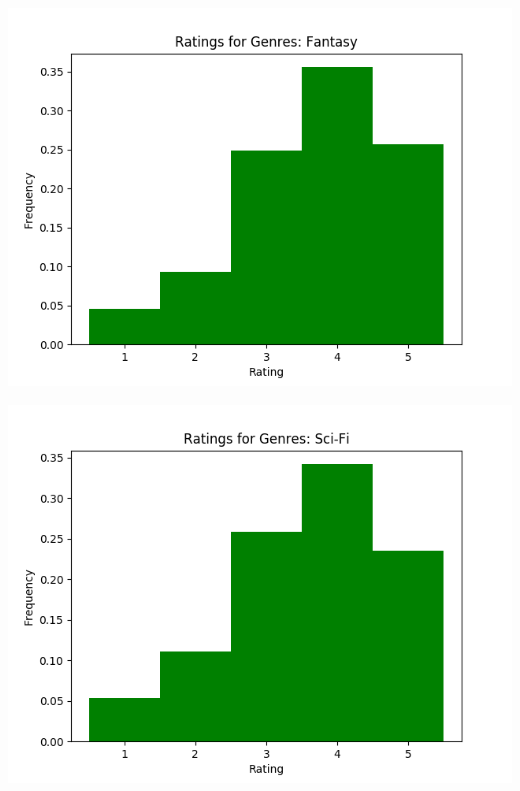 \begin{appendices}
\begin{center}
\begin{minipage}{0.49\linewidth}
  \end{minipage}
  \begin{minipage}{0.49\linewidth}
    \includegraphics[scale=0.5]{"Ratings for Genres: Fantasy"}
    \captionsetup{width=.75\linewidth}
  \end{minipage}
  \begin{minipage}{0.49\linewidth}
    \includegraphics[scale=0.5]{"Ratings for Genres: Sci-Fi"}
    \captionsetup{width=.75\linewidth}
  \end{minipage}
  \begin{minipage}{0.49\linewidth}

\end{minipage}
\end{center}
\end{appendices}
